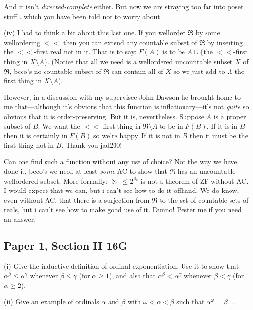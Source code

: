 \documentclass{book}
\begin{document}
And it isn't {\sl directed-complete} either.  But now we are straying
too far into poset stuff \ldots which you have been told not to worry
about.
\medskip


(iv) I had to think a bit about this last one.  If you wellorder $\Re$ by
some wellordering $<<$ then you can extend any countable subset of
$\Re$ by inserting the $<<$-first real not in it.  That is to say:
$F(A)$ is to be $A \cup \{$the $<<$-first thing in $X \setminus A\}$.
(Notice that all we need is a wellordered uncountable subset $X$ of
$\Re$, beco's no countable subset of $\Re$ can contain all of $X$ so
we just add to $A$ the first thing in $X\setminus A$).

However, in a discussion with my supervisee John Dawson he brought
home to me that---although it's obvious that this function is
inflationary---it's not {\sl quite} so obvious that it is
order-preserving.  But it is, nevertheless. Suppose $A$ is a proper
subset of $B$.  We want the $<<$-first thing in $\Re \setminus A$ to be
in $F(B)$. If it is in $B$ then it is certainly in $F(B)$ so we're
happy.  If it is not in $B$ then it must be the first thing not in
$B$. Thank you jad200!

Can one find such a function without any use of choice?  Not the way
we have done it, beco's we need at least {\sl some} AC to show that
$\Re$ has an uncountable wellordered subset.  More formally: $\aleph_1
\leq 2^{\aleph_0}$ is not a theorem of ZF without AC. I would expect
that we can, but i can't see how to do it offhand.  We do know, even
without AC, that there is a surjection from $\Re$ to the set of
countable sets of reals, but i can't see how to make good use of it.
Dunno!  Pester me if you need an answer.

\subsection*{Paper 1, Section II 16G}

(i)  Give the inductive definition of ordinal exponentiation.
Use it to show that $\alpha^\beta \leq \alpha^\gamma$ whenever
$\beta \leq\gamma$ (for $\alpha \geq 1$), and also that
$\alpha^\beta <\alpha^\gamma$ whenever $\beta < \gamma$ (for
$\alpha \geq 2$).

\smallskip

\noindent(ii) Give an example of ordinals $\alpha$ and $\beta$ with
$\omega < \alpha < \beta$ such that $\alpha^\omega = \beta^\omega$ .

\smallskip
\end{document}
